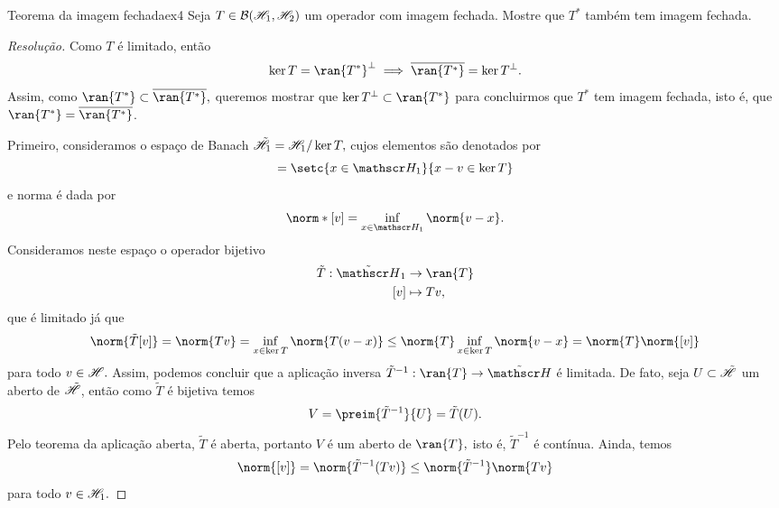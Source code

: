 \begin{exercício}{Teorema da imagem fechada}{ex4}
  Seja \(T \in \mathcal{B}(\mathscr{H}_1, \mathscr{H}_2)\) um operador com imagem fechada. Mostre que \(T^*\) também tem imagem fechada.
\end{exercício}
\begin{proof}[Resolução]
  Como \(T\) é limitado, então
  \begin{equation*}
    \ker{T} = \ran{T^*}^\perp \implies \closure{\ran{T^*}} = \ker{T}^\perp.
  \end{equation*}
  Assim, como \(\ran{T^*} \subset \closure{\ran{T^*}},\) queremos mostrar que \(\ker{T}^\perp \subset \ran{T^*}\) para concluirmos que \(T^*\) tem imagem fechada, isto é, que \(\ran{T^*} = \closure{\ran{T^*}}\).

  Primeiro, consideramos o espaço de Banach \(\tilde{\mathscr{H}}_1 = \mathscr{H}_1 / \ker{T},\) cujos elementos são denotados por
  \begin{equation*}
    [v] = \setc{x \in \hilbert_1}{x - v \in \ker{T}}
  \end{equation*}
  e norma é dada por
  \begin{equation*}
    \norm*{[v]} = \inf_{x \in \hilbert_1}{\norm{v - x}}.
  \end{equation*}
  Consideramos neste espaço o operador bijetivo
  \begin{align*}
    \tilde{T} : \tilde{\hilbert}_1 &\to \ran{T}\\
                               [v] &\mapsto Tv,
  \end{align*}
  que é limitado já que
  \begin{equation*}
    \norm{\tilde{T}[v]} = \norm{Tv} = \inf_{x \in \ker{T}}{\norm{T(v - x)}} \leq \norm{T} \inf_{x \in \ker{T}}{\norm{v - x}} = \norm{T} \norm{[v]}
  \end{equation*}
  para todo \(v \in \mathscr{H}.\) Assim, podemos concluir que a aplicação inversa \(\tilde{T}^{-1} : \ran{T} \to \tilde{\hilbert}\) é limitada. De fato, seja \(U \subset \tilde{\mathscr{H}}\) um aberto de \(\tilde{\mathscr{H}}\), então como \(\tilde{T}\) é bijetiva temos
  \begin{equation*}
    V = \preim{\tilde{T}^{-1}}{U} = \tilde{T}(U).
  \end{equation*}
  Pelo teorema da aplicação aberta, \(\tilde{T}\) é aberta, portanto \(V\) é um aberto de \(\ran{T},\) isto é, \(\tilde{T}^{-1}\) é contínua. Ainda, temos
  \begin{equation*}
    \norm{[v]} = \norm{\tilde{T}^{-1}(Tv)} \leq \norm{\tilde{T}^{-1}} \norm{Tv}
  \end{equation*}
  para todo \(v \in \mathscr{H}_1.\)


\end{proof}
